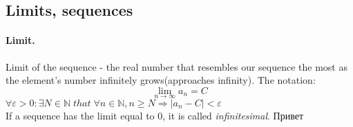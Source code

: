 \documentclass{article}
\newcommand{\N}{\mathbb{N}}
\begin{document}
\subsection{Limits, sequences}

\paragraph{Limit.}
Limit of the sequence - the real number that resembles our sequence the most as the element's number infinitely grows(approaches infinity). The notation: 
\[
\lim_{n \to \infty} a_n = C
\]
$\forall \varepsilon > 0: \exists N \in \N \; that \; \forall n \in \N, n \geq N \Rightarrow |a_n -C| < \varepsilon$
\\
If a sequence has the limit equal to 0, it is called {\it infinitesimal}.
Привет
\end{document}
